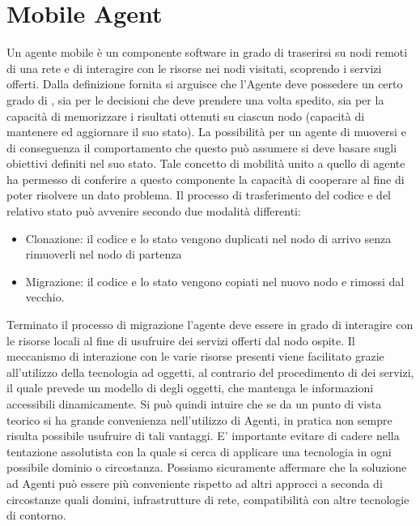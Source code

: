 \section{Mobile Agent}
Un agente mobile\cite{fuggetta} è un componente software in grado di traserirsi su nodi remoti di una rete e di interagire con le risorse nei nodi visitati, scoprendo i servizi offerti.
Dalla definizione fornita si arguisce che l'Agente deve possedere un certo grado di , sia per le decisioni che deve prendere una volta spedito, sia per la capacità di memorizzare i risultati ottenuti su ciascun nodo (capacità di mantenere ed aggiornare il suo stato).
La possibilità per un agente di muoversi e di conseguenza il comportamento che questo può assumere si deve basare sugli obiettivi definiti nel suo stato. Tale concetto di mobilità unito a quello di agente ha permesso di conferire a questo componente la capacità di cooperare al fine di poter risolvere un dato problema.
Il processo di trasferimento del codice e del relativo stato può avvenire secondo due modalità differenti:
\begin{itemize}
\item Clonazione: il codice e lo stato vengono duplicati nel nodo di arrivo senza rimuoverli nel nodo di partenza
\item Migrazione: il codice e lo stato vengono copiati nel nuovo nodo e rimossi dal vecchio. 
\end{itemize}
Terminato il processo di migrazione l'agente deve essere in grado di interagire con le risorse locali al fine di usufruire dei servizi offerti dal nodo ospite.
Il meccanismo di interazione con le varie risorse presenti viene facilitato grazie all'utilizzo della tecnologia ad oggetti, al contrario del procedimento di  dei servizi, il quale prevede un modello di    degli oggetti, che mantenga le informazioni accessibili dinamicamente.
Si può quindi intuire che se da un punto di vista teorico si ha grande convenienza nell’utilizzo di Agenti, in pratica non sempre risulta possibile usufruire di tali vantaggi. E’ importante evitare di cadere nella tentazione assolutista con la quale si cerca di applicare una tecnologia in ogni possibile dominio o circostanza. Possiamo sicuramente affermare che la soluzione ad Agenti può essere più conveniente rispetto ad altri approcci a seconda di circostanze quali domini, infrastrutture di rete, compatibilità con altre
tecnologie di contorno.  

